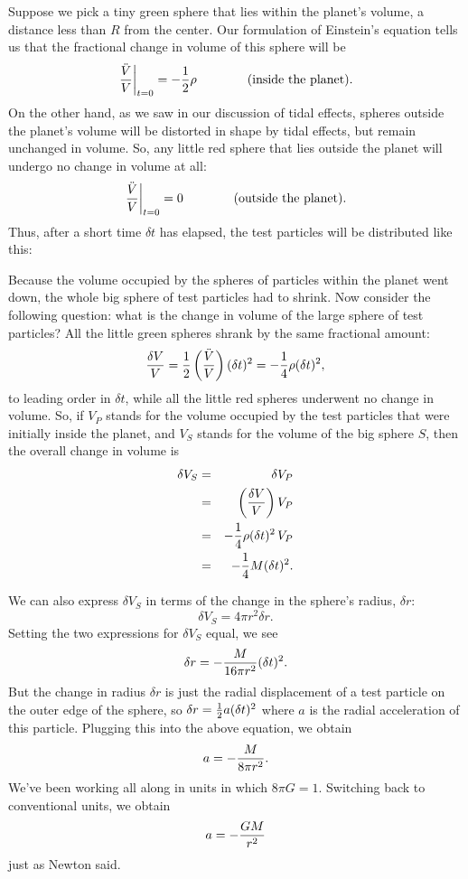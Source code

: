\centerline{\epsfxsize 5in } 

Suppose we pick a tiny green sphere that lies within the planet's 
volume, a distance less than $R$ from the center.   Our formulation 
of Einstein's equation tells us that the fractional change in volume 
of this sphere will be  
\[ 
\left.{\ddot V\over V}\right|_{t=0}=-{1\over 2}\rho 
\qquad\qquad\mbox{(inside the planet).} 
\]
On the other hand, as we saw in our discussion of tidal effects,  
spheres outside the planet's volume will be distorted in shape by 
tidal effects, but remain unchanged in volume.  So, any little red 
sphere that lies outside the planet will undergo no change in volume 
at all: 
\[ 
\left.{\ddot V\over V}\right|_{t=0}=0\qquad\qquad\mbox{(outside the  
planet).} 
\]
Thus, after a short time $\delta t$ has elapsed, the test 
particles will be distributed like this: 
 
\centerline{\epsfxsize 5in } 
 
Because the volume occupied by the spheres of particles within 
the planet went down, the whole big sphere of test particles had 
to shrink.  Now consider the following question:  
what is the change in volume of the large sphere of test 
particles?  All the little green spheres shrank by the same fractional 
amount:
\[ 
{\delta V\over V}
= {1\over 2}\left(\ddot V\over V\right)(\delta t)^2
= - {1\over 4}\rho (\delta t)^2, 
\] 
to leading order in $\delta t$, 
while all the little red spheres underwent no change in volume. 
So, if $V_P$ stands for the volume occupied by the test particles 
that were initially inside the planet, and $V_{S}$ stands for the
volume of the big sphere $S$, then the overall change in volume is
\begin{eqnarray*} 
\delta V_S &=& \delta V_P             \\ 
&=&\left(\delta V\over V\right)V_P    \\ 
&=& -{1\over 4}\rho(\delta t)^2 \, V_P \\ 
&=&-{1\over 4}M(\delta t)^2. 
\end{eqnarray*} 

We can also express $\delta V_S$ in terms of the change in 
the sphere's radius, $\delta r$: 
\[ 
\delta V_S = 4\pi r^2 \delta r. 
\]
Setting the two expressions for $\delta V_S$ equal, we see
\[
\delta r = -{M\over 16\pi r^2}(\delta t)^2. 
\]
But the change in radius $\delta r$ is just the radial displacement of 
a test particle on the outer edge of the sphere, so
$\delta r={1\over 2} a (\delta t)^2$ where $a$ is the radial
acceleration of this particle.
Plugging this into the above equation, we obtain
\[
a = -{M\over 8\pi r^2}. 
\]
We've been working all along in units in which $8\pi G=1$.  Switching 
back to conventional units, we obtain
\[ 
a = -{GM\over r^2}
\] 
just as Newton said.
 
